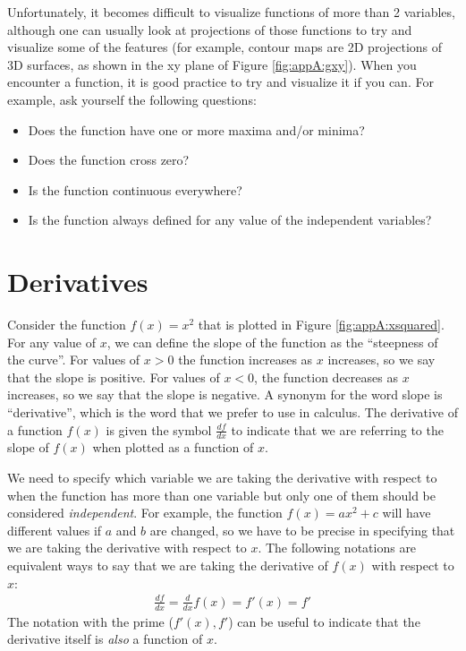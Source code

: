 Unfortunately, it becomes difficult to visualize functions of more than 2 variables, although one can usually look at projections of those functions to try and visualize some of the features (for example, contour maps are 2D projections of 3D surfaces, as shown in the xy plane of Figure \ref{fig:appA:gxy}). When you encounter a function, it is good practice to try and visualize it if you can. For example, ask yourself the following questions:
\begin{itemize}
\item Does the function have one or more maxima and/or minima?
\item Does the function cross zero?
\item Is the function continuous everywhere?
\item Is the function always defined for any value of the independent variables?
\end{itemize} 

\section{Derivatives}
Consider the function $f(x)=x^2$ that is plotted in Figure \ref{fig:appA:xsquared}. For any value of $x$, we can define the slope of the function as the ``steepness of the curve''. For values of $x>0$ the function increases as $x$ increases, so we say that the slope is positive. For values of $x<0$, the function decreases as $x$ increases, so we say that the slope is negative. A synonym for the word slope is ``derivative'', which is the word that we prefer to use in calculus. The derivative of a function $f(x)$ is given the symbol $\frac{df}{dx}$ to indicate that we are referring to the slope of $f(x)$ when plotted as a function of $x$. 

We need to specify which variable we are taking the derivative with respect to when the function has more than one variable but only one of them should be considered \textit{independent}. For example, the function $f(x)=ax^2+c$ will have different values if $a$ and $b$ are changed, so we have to be precise in specifying that we are taking the derivative with respect to $x$. The following notations are equivalent ways to say that we are taking the derivative of $f(x)$ with respect to $x$:
\begin{align*}
\frac{df}{dx}=\frac{d}{dx} f(x) = f'(x) = f'
\end{align*}
The notation with the prime ($f'(x),f'$) can be useful to indicate that the derivative itself is \textit{also} a function of $x$. 

